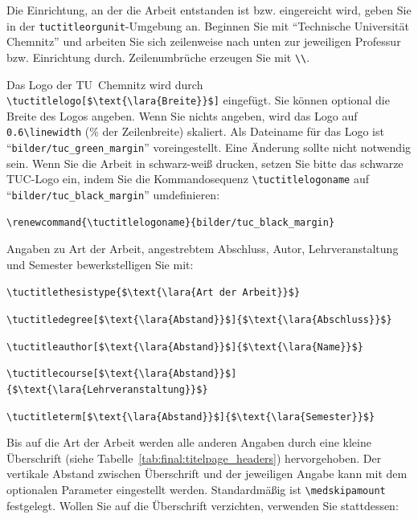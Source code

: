 Die Einrichtung, an der die Arbeit entstanden ist bzw. eingereicht wird, geben
Sie in der \texttt{tuctitleorgunit}-Umgebung an. Beginnen Sie mit "`Technische
Universität Chemnitz"' und arbeiten Sie sich zeilenweise nach unten zur
jeweiligen Professur bzw. Einrichtung durch. Zeilenumbrüche erzeugen Sie mit
\verb+\\+.

Das Logo der TU~Chemnitz wird durch \lstinline[language={[LaTeX]{TeX}},mathescape]+\tuctitlelogo[$\text{\lara{Breite}}$]+
eingefügt. Sie können optional die Breite des Logos angeben. Wenn Sie nichts
angeben, wird das Logo auf \verb+0.6\linewidth+ (\unit[60]{\%} der Zeilenbreite)
skaliert. Als Dateiname für das Logo ist "`\texttt{bilder/tuc\_green\_margin}"'
voreingestellt. Eine Änderung sollte nicht notwendig sein. Wenn Sie die Arbeit
in schwarz-weiß drucken, setzen Sie bitte das schwarze TUC-Logo ein, indem Sie
die Kommandosequenz \verb+\tuctitlelogoname+ auf
"`\texttt{bilder/tuc\_black\_margin}"' umdefinieren:
%
\begin{lstlisting}[language={[LaTeX]{TeX}},style=block]
\renewcommand{\tuctitlelogoname}{bilder/tuc_black_margin}
\end{lstlisting}

Angaben zu Art der Arbeit, angestrebtem Abschluss, Autor, Lehrveranstaltung und
Semester bewerkstelligen Sie mit:

\begin{compactitem}
\item \lstinline[language={[LaTeX]{TeX}},mathescape]+\tuctitlethesistype{$\text{\lara{Art der Arbeit}}$}+
\item \lstinline[language={[LaTeX]{TeX}},mathescape]+\tuctitledegree[$\text{\lara{Abstand}}$]{$\text{\lara{Abschluss}}$}+
\item \lstinline[language={[LaTeX]{TeX}},mathescape]+\tuctitleauthor[$\text{\lara{Abstand}}$]{$\text{\lara{Name}}$}+
\item \lstinline[language={[LaTeX]{TeX}},mathescape]+\tuctitlecourse[$\text{\lara{Abstand}}$]{$\text{\lara{Lehrveranstaltung}}$}+
\item \lstinline[language={[LaTeX]{TeX}},mathescape]+\tuctitleterm[$\text{\lara{Abstand}}$]{$\text{\lara{Semester}}$}+
\end{compactitem}

Bis auf die Art der Arbeit werden alle anderen Angaben durch eine kleine
Überschrift (siehe Tabelle~\ref{tab:final:titelpage_headers}) hervorgehoben.
Der vertikale Abstand zwischen Überschrift und der jeweiligen Angabe kann mit
dem optionalen Parameter eingestellt werden. Standardmäßig ist
\verb+\medskipamount+ festgelegt. Wollen Sie auf die Überschrift verzichten,
verwenden Sie stattdessen:

